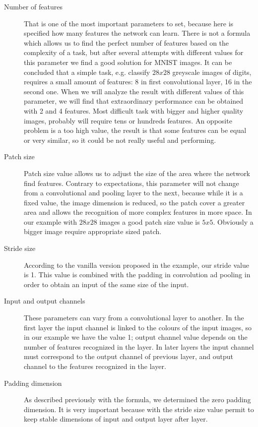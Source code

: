 \begin{description}
	
	\item[Number of features] That is one of the most important parameters to set, because here is specified how many features the network can learn. There is not a formula which allows us to find the perfect number of features based on the complexity of a task, but after several attempts with different values for this parameter we find a good solution for MNIST images. It can be concluded that a simple task, e.g. classify $28x28$ greyscale images of digits, requires a small amount of features: 8 in first convolutional layer, 16 in the second one. When we will analyze the result with different values of this parameter, we will find that extraordinary performance can be obtained with 2 and 4 features. Most difficult task with bigger and higher quality images, probably will require tens or hundreds features. An opposite problem is a too high value, the result is that some features can be equal or very similar, so it could be not really useful and performing.

	\item[Patch size] Patch size value allows us to adjust the size of the area where the network find features. Contrary to expectations, this parameter will not change from a convolutional and pooling layer to the next, because while it is a fixed value, the image dimension is reduced, so the patch cover a greater area and allows the recognition of more complex features in more space.  In our example with $28x28$ images a good patch size value is $5x5$. Obviously a bigger image require appropriate sized patch.
	
	\item[Stride size] According to the vanilla version proposed in the example, our stride value is 1. This value is combined with the padding in convolution ad pooling in order to obtain an input of the same size of the input.
	
	\item[Input and output channels] These parameters can vary from a convolutional layer to another. In the first layer the input channel is linked to the colours of the input images, so in our example we have the value 1; output channel value depends on the number of features recognized in the layer. In later layers the input channel must correspond to the output channel of previous layer, and output channel to the features recognized in the layer.
	
	\item[Padding dimension] As described previously with the formula, we determined the zero padding dimension. It is very important because with the stride size value permit to keep stable dimensions of input and output layer after layer.

\end{description}

